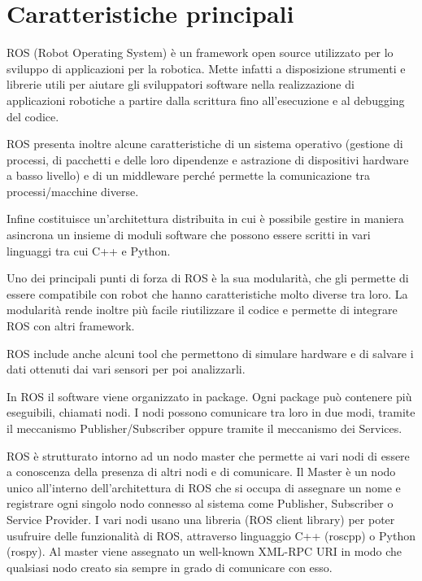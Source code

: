\documentclass[Lau, binding=0.6cm, twoside]{sapthesis}
\begin{document}
\section{Caratteristiche principali}
ROS (Robot Operating System) è un framework open source utilizzato per lo sviluppo di applicazioni per la robotica.
Mette infatti a disposizione strumenti e librerie utili per aiutare gli sviluppatori software nella realizzazione di applicazioni robotiche a partire dalla scrittura fino all’esecuzione e al debugging del codice.

ROS presenta inoltre alcune caratteristiche di un sistema operativo (gestione di processi, di pacchetti e delle loro dipendenze e astrazione di dispositivi hardware a basso livello) e di un middleware perché permette la comunicazione tra processi/macchine diverse.

Infine costituisce un’architettura distribuita in cui è possibile gestire in maniera asincrona un insieme di moduli software che possono essere scritti in vari linguaggi tra cui C++ e Python.

Uno dei principali punti di forza di ROS è la sua modularità, che gli permette di essere compatibile con robot che hanno caratteristiche molto diverse tra loro.
La modularità rende inoltre più facile riutilizzare il codice e permette di integrare ROS con altri framework.

ROS include anche alcuni tool che permettono di simulare hardware e di salvare i dati ottenuti dai vari sensori per poi analizzarli.

In ROS il software viene organizzato in package. Ogni package può contenere più eseguibili, chiamati nodi.
I nodi possono comunicare tra loro in due modi, tramite il meccanismo Publisher/Subscriber oppure tramite il meccanismo dei Services.

ROS è strutturato intorno ad un nodo master che permette ai vari nodi di essere a conoscenza della presenza di altri nodi e di comunicare.
Il Master è un nodo unico all’interno dell’architettura di ROS che si occupa di assegnare un nome e registrare ogni singolo nodo connesso al sistema come Publisher, Subscriber o Service Provider.
I vari nodi usano una libreria (ROS client library) per poter usufruire delle funzionalità di ROS, attraverso linguaggio C++ (roscpp) o Python (rospy).
Al master viene assegnato un well-known XML-RPC URI in modo che qualsiasi nodo creato sia sempre in grado di comunicare con esso.
\end{document}
